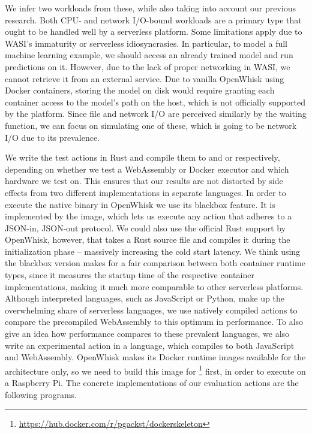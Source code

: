 We infer two workloads from these, while also taking into account our previous research. Both CPU- and network I/O-bound workloads are a primary type that ought to be handled well by a serverless platform. Some limitations apply due to WASI's immaturity or serverless idiosyncrasies. In particular, to model a full machine learning example, we should access an already trained model and run predictions on it. However, due to the lack of proper networking in WASI, we cannot retrieve it from an external service. Due to vanilla OpenWhisk using Docker containers, storing the model on disk would require granting each container access to the model's path on the host, which is not officially supported by the platform. Since file and network I/O are perceived similarly by the waiting function, we can focus on simulating one of these, which is going to be network I/O due to its prevalence.

We write the test actions in Rust and compile them to  and  or  respectively, depending on whether we test a WebAssembly or Docker executor and which hardware we test on. This ensures that our results are not distorted by side effects from two different implementations in separate languages. In order to execute the native binary in OpenWhisk we use its blackbox feature. It is implemented by the  image, which lets us execute any action that adheres to a JSON-in, JSON-out protocol. We could also use the official Rust support by OpenWhisk, however, that takes a Rust source file and compiles it during the initialization phase -- massively increasing the cold start latency. We think using the blackbox version makes for a fair comparison between both container runtime types, since it measures the startup time of the respective container implementations, making it much more comparable to other serverless platforms. Although interpreted languages, such as JavaScript or Python, make up the overwhelming share of serverless languages, we use natively compiled actions to compare the precompiled WebAssembly to this optimum in performance. To also give an idea how performance compares to these prevalent languages, we also write an experimental action in a language, which compiles to both JavaScript and WebAssembly.
OpenWhisk makes its Docker runtime images available for the  architecture only, so we need to build this image for \footnote{\url{https://hub.docker.com/r/pgackst/dockerskeleton}} first, in order to execute on a Raspberry Pi. The concrete implementations of our evaluation actions are the following programs.

